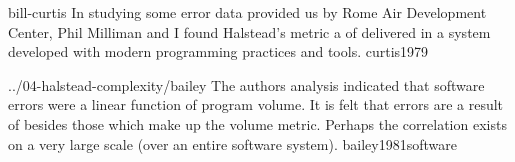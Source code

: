 \documentclass{article}
\begin{document}
\lnQuote
  {bill-curtis}
  {In studying some error data provided us by Rome Air Development Center, Phil Milliman and I found Halstead's metric a  of delivered  in a system developed with modern programming practices and tools.}
  {curtis1979}

\lnQuote
  {../04-halstead-complexity/bailey}
  {The authors analysis indicated that software errors were  a linear function of program volume. It is felt that errors are a result of  besides those which make up the volume metric. Perhaps the correlation exists on a very large scale (over an entire software system).}
  {bailey1981software}

\end{document}
